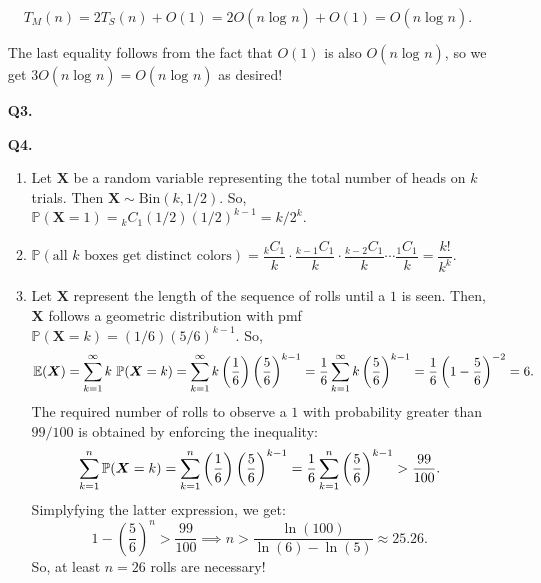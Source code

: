 \documentclass[10pt, letterpaper]{article}
\begin{document}
\begin{enumerate}
\begin{proof*}
      \[
        T_M(n) = 2T_S(n) + O(1) = 2O(n\log_{}n) + O(1) = O(n\log_{}n).
      \]

      The last equality follows from the fact that $O(1)$ is also $O(n\log_{}n)$, so we get
      $3O(n\log_{}n) = O(n\log_{}n)$ as desired!
    \end{proof*}

  \item[\textbf{Q3.}]
  \item[\textbf{Q4.}]
    \begin{enumerate}
      \item 
        Let $\bm{X}$ be a random variable representing the total number of heads on $k$
        trials. Then $\bm{X} \sim \text{Bin}(k, 1/2)$. So, $\mathbb{P}(\bm{X} = 1) = 
        {}_kC_1(1/2)(1/2)^{k-1} = k/2^k$. \\

      \item
        $\mathbb{P}(\text{all $k$ boxes get distinct colors}) = \dfrac{{}_kC_1}{k} \cdot 
        \dfrac{{}_{k-1}C_1}{k} \cdot \dfrac{{}_{k-2}C_1}{k} \cdots \dfrac{{}_1C_1}{k} =
        \dfrac{k!}{k^k}$. \\

      \item
        Let $\bm{X}$ represent the length of the sequence of rolls until a $1$ is seen.
        Then, $\bm{X}$ follows a geometric distribution with pmf $\mathbb{P}(\bm{X} = k)
        = \left(1/6\right) \left(5/6\right)^{k-1}$. So,
        \[
          \mathbb{E}(\bm{X})
            = \displaystyle\sum_{k=1}^{\infty} k\ \mathbb{P}(\bm{X} = k)
            = \displaystyle\sum_{k=1}^{\infty} k \left(\dfrac{1}{6}\right) \left(\dfrac{5}{6}\right)^{k-1}
            = \dfrac{1}{6} \displaystyle\sum_{k=1}^{\infty} k \left(\dfrac{5}{6}\right)^{k-1}
            = \dfrac{1}{6} \left(1-\dfrac{5}{6} \right)^{-2}
            = 6.
       \]
        The required number of rolls to observe a $1$ with probability greater than $99/100$
        is obtained by enforcing the inequality: 
        \[
          \displaystyle\sum_{k=1}^{n}\mathbb{P}(\bm{X} = k) 
            = \displaystyle\sum_{k=1}^{n} \left(\dfrac{1}{6}\right) \left(\dfrac{5}{6}\right)^{k-1}
            = \dfrac{1}{6} \displaystyle\sum_{k=1}^{n} \left(\dfrac{5}{6}\right)^{k-1} > \dfrac{99}{100}.
        \]
        Simplyfying the latter expression, we get: 
        \[
          1 - \left(\dfrac{5}{6}\right)^{n} > \dfrac{99}{100} \implies n > \dfrac{\ln(100)}
          {\ln(6) - \ln(5)} \approx 25.26.
        \]
        So, at least $n = 26$ rolls are necessary!
    \end{enumerate}


\end{enumerate}
\end{document}
